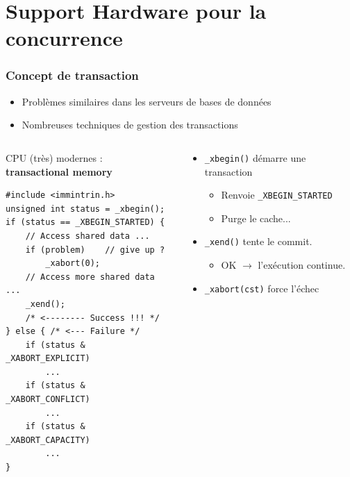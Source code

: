 \documentclass[xcolor={x11names,svgnames}]{beamer}
\begin{document}

\section{Support Hardware pour la concurrence}

\begin{frame}[fragile, label=rtm]
  \frametitle{Concept de \og transaction \fg{}}

  \begin{itemize}
  \item Problèmes similaires dans les serveurs de bases de données
  \item Nombreuses techniques de gestion des transactions
  \end{itemize}

  \begin{columns}
    \begin{column}{0.47\textwidth}
  \begin{alertblock}{CPU (très) modernes :\\ \textbf{transactional memory}}
\begin{verbatim}
#include <immintrin.h>
unsigned int status = _xbegin();
if (status == _XBEGIN_STARTED) {
    // Access shared data ...
    if (problem)    // give up ?
        _xabort(0); 
    // Access more shared data ...
    _xend();
    /* <-------- Success !!! */
} else { /* <--- Failure */
    if (status & _XABORT_EXPLICIT)
        ...
    if (status & _XABORT_CONFLICT)
        ...    
    if (status & _XABORT_CAPACITY)
        ...
}
\end{verbatim}
  \end{alertblock}
\end{column}
\begin{column}{0.63\textwidth}
  \begin{itemize}
  \item \verb|_xbegin()| démarre une transaction
    \begin{itemize}
    \item Renvoie \verb|_XBEGIN_STARTED|
    \item Purge le cache...
    \end{itemize}
  \item \verb|_xend()| tente le \og commit\fg{}.
    \begin{itemize}
    \item OK $\rightarrow$ l'exécution continue.
    \end{itemize}
  \item \verb|_xabort(cst)| force l'échec


\end{itemize}
\end{column}
\end{columns}
\end{frame}
\end{document}
